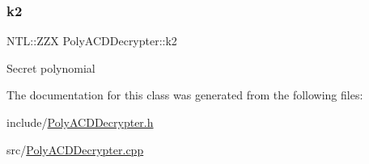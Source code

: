 \subsubsection{\texorpdfstring{k2}{k2}}
{\footnotesize\ttfamily N\+T\+L\+::\+Z\+ZX Poly\+A\+C\+D\+Decrypter\+::k2\hspace{0.3cm}{\ttfamily [private]}}

Secret polynomial 

The documentation for this class was generated from the following files\+:\begin{DoxyCompactItemize}
\item 
include/\hyperlink{PolyACDDecrypter_8h}{Poly\+A\+C\+D\+Decrypter.\+h}\item 
src/\hyperlink{PolyACDDecrypter_8cpp}{Poly\+A\+C\+D\+Decrypter.\+cpp}\end{DoxyCompactItemize}
